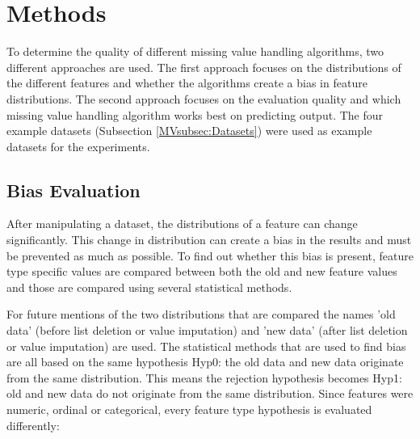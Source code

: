\documentclass[10pt,a4paper]{report}
\begin{document}
	\section{Methods}
	\label{MVsec:Methods}
	
	To determine the quality of different missing value handling algorithms, two different approaches are used. The first approach focuses on the distributions of the different features and whether the algorithms create a bias in feature distributions. The second approach focuses on the evaluation quality and which missing value handling algorithm works best on predicting output. The four example datasets (Subsection \ref{MVsubsec:Datasets}) were used as example datasets for the experiments.
	
	
	\subsection{Bias Evaluation}
	\label{MVsubsec:BiasEvaluation}
	
	After manipulating a dataset, the distributions of a feature can change significantly. This change in distribution can create a bias in the results and must be prevented as much as possible. To find out whether this bias is present, feature type specific values are compared between both the old and new feature values and those are compared using several statistical methods.
	
	For future mentions of the two distributions that are compared the names 'old data' (before list deletion or value imputation) and 'new data' (after list deletion or value imputation) are used. The statistical methods that are used to find bias are all based on the same hypothesis Hyp0: the old data and new data originate from the same distribution. This means the rejection hypothesis becomes Hyp1: old and new data do not originate from the same distribution. Since features were numeric, ordinal or categorical, every feature type hypothesis is evaluated differently:
	
\end{document}
